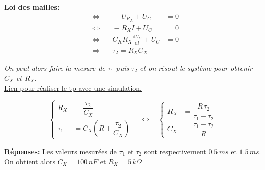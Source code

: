 \documentclass{article}
\begin{document}
{\begin{center}
            \noindent\textbf{Loi des mailles:} 
            \begin{align*}
                &\Longleftrightarrow &\quad -U_{R_X} + U_C &= 0 \\
                &\Longleftrightarrow &\quad -R_X I + U_C &= 0 \\
                &\Longleftrightarrow &\quad C_X R_X \frac{\mathrm{d}U_C}{\mathrm{d}t} + U_C &= 0 \\
                &\Longrightarrow &\quad \tau_2=R_X C_X
            \end{align*}
        \end{center}
    }

    \vspace{5mm}
    \begin{center}
        \textit{On peut alors faire la mesure de $\tau_1$ puis $\tau_2$ et on résout le système pour obtenir $C_X$ et $R_X$.}\\
        \href{https://falstad.com/circuit/circuitjs.html?ctz=CQAgTADCEHQf8CsICcMDsAOAzClmAWRbANkzAEZsREpkDrEBTAWgooCgA3EbMETFHb9B0cDShgYyKciixEHAE4hhqlPz7r+dBBwDGvfhQ1GBUAqrgIbt+BVbpo1iBUTp3EDwQLkweEmd7aANeUm0wwNFLChc7OwcWJ1g3dHRsRAIUDzwIMEQCoNcQlQIKKItyiKEbbkjzEDKKsX5acGl2uWdFUqqTTXD+sVp4DgB3VQpjUzVRCA4AD3EwQIoicBRG8EsAEQBLgBcmJQBbAEsAO2OAHQBnQFYNwHh9wECCRd54bcaGcCdLMF3DsdzlclHcnoAggjeJAo4DA1EwgTAKy2-xAACVAMkEb1IiLhvBQMKRgT+lkxbwY1DWxLaa02JPRHAA9i0xAQIPgaEF8qyxNQdOJsEzOfy2Ry5DAYTDLMhqNQoLKOEA}
        {Lien pour réaliser le tp avec une simulation.}
    \end{center}

    

    \[
        \left\{    
            \begin{aligned}
                R_X &= \dfrac{\tau_2}{C_X} \\
                \tau_1 &= C_X\left(R+\dfrac{\tau_2}{C_X}\right)
            \end{aligned}
        \right. 
        \quad \Longleftrightarrow\quad \left\{    
            \begin{aligned}
                R_X &= \dfrac{R\,\tau_2}{\tau_1-\tau_2} \\
                C_X &= \dfrac{\tau_1-\tau_2}{R}
            \end{aligned}
        \right. 
    \]

    \vspace{1cm}

    \noindent\textbf{Réponses:}
    Les valeurs mesurées de $\tau_1$ et $\tau_2$ sont respectivement $0.5\,ms$ et $1.5\,ms$.\\
    On obtient alors $C_X=100\,nF$ et $R_X=5\,k\Omega$
\end{document}
